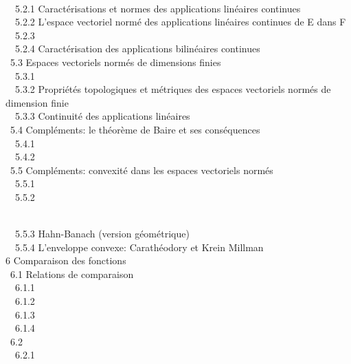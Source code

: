 \documentclass[]{article}
\begin{document}
\\ ~~5.2.1 {Caractérisations et
normes des applications linéaires continues} \\ ~~5.2.2
{L'espace vectoriel normé des
applications linéaires continues de E dans F} \\ ~~5.2.3
 \\
~~5.2.4 {Caractérisation des
applications bilinéaires continues} \\ ~5.3
{Espaces vectoriels normés de
dimensions finies} \\ ~~5.3.1
 \\
~~5.3.2 {Propriétés topologiques
et métriques des espaces vectoriels normés de dimension finie} \\
~~5.3.3 {Continuité des
applications linéaires} \\ ~5.4
{Compléments: le théorème de Baire
et ses conséquences} \\ ~~5.4.1
 \\ ~~5.4.2
 \\ ~5.5
{Compléments: convexité dans les
espaces vectoriels normés} \\ ~~5.5.1
 \\ ~~5.5.2

\\ ~~5.5.3 {Hahn-Banach (version
géométrique)} \\ ~~5.5.4
{L'enveloppe convexe: Carathéodory
et Krein Millman} \\ 6 {Comparaison des
fonctions} \\ ~6.1 {Relations de
comparaison} \\ ~~6.1.1
 \\ ~~6.1.2
 \\
~~6.1.3  \\ ~~6.1.4
 \\ ~6.2
 \\ ~~6.2.1
\end{document}
